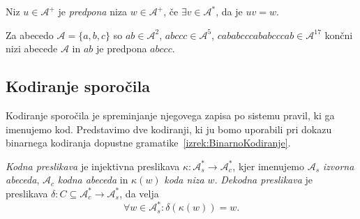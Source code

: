 \documentclass[fin1, tisk]{fmfdelo}
\newcommand{\A}{\mathcal{A}}
\theoremstyle{definition}
\begin{document}
\begin{definicija}
    Niz $u \in \A^+$ je \emph{predpona} niza $w \in \A^+$, če $\exists v \in \A^*$, da je
    $uv = w$.
\end{definicija}

\begin{primer}\label{primer:string}
    Za abecedo $\A = \{ a,b,c \}$ so $\mathit{ab} \in \A^2$, $\mathit{abccc} \in \A^5$,
    $\mathit{cababcccababcccab} \in \A^{17}$ končni nizi abecede $\A$ in $\mathit{ab}$ je
    predpona $\mathit{abccc}$.
\end{primer}

\subsection{Kodiranje sporočila}

Kodiranje sporočila je spreminjanje njegovega zapisa po sistemu pravil, ki ga imenujemo kod.
Predstavimo dve kodiranji, ki ju bomo uporabili pri dokazu binarnega kodiranja dopustne
gramatike~\ref{izrek:BinarnoKodiranje}.

\begin{definicija}
    \emph{Kodna preslikava} je injektivna preslikava $ \kappa \colon \A^*_s
    \to \A_c^* $, kjer imenujemo $\A_s$ \emph{izvorna abeceda}, $\A_c$ 
    \emph{kodna abeceda} in $\kappa(w)$ \emph{koda niza $w$}. 
    \emph{Dekodna preslikava} je preslikava $ \delta \colon C \subseteq \A^*_c 
    \to \A_s^* $, da velja
    \[
        \forall w \in \A_s^* \colon \delta(\kappa(w)) = w.
    \]
\end{definicija}
\end{document}
